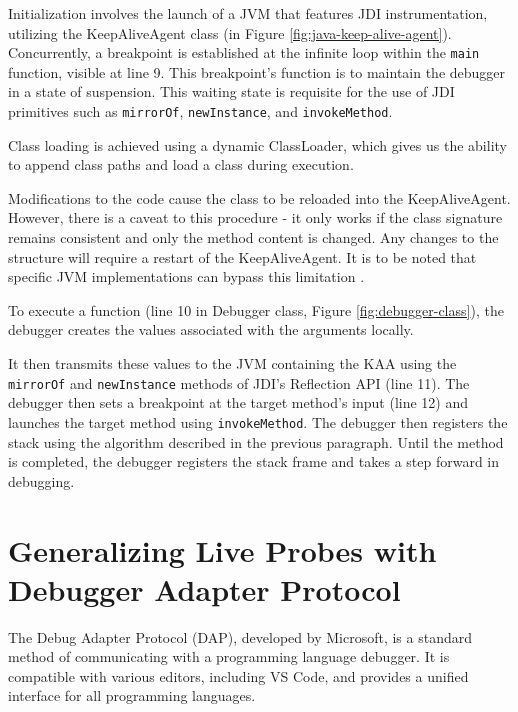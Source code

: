 \documentclass[english,submission]{programming}
\newcommand{\code}[1]{\colorbox{codegray}{\texttt{#1}}}
\begin{document}
Initialization involves the launch of a JVM that features JDI instrumentation, utilizing the KeepAliveAgent class (in Figure \ref{fig:java-keep-alive-agent}). 
Concurrently, a breakpoint is established at the infinite loop within the \code{main} function, visible at line 9. 
This breakpoint's function is to maintain the debugger in a state of suspension. This waiting state is requisite for the use of JDI primitives such as \code{mirrorOf}, \code{newInstance}, and \code{invokeMethod}.

Class loading is achieved using a dynamic ClassLoader, which gives us the ability to append class paths and load a class during execution. 

Modifications to the code cause the class to be reloaded into the KeepAliveAgent.
However, there is a caveat to this procedure - it only works if the class signature remains consistent and only the method content is changed. 
Any changes to the structure will require a restart of the KeepAliveAgent. 
It is to be noted that specific JVM implementations can bypass this limitation \cite{}.

To execute a function (line 10 in Debugger class, Figure \ref{fig:debugger-class}), the debugger creates the values associated with the arguments locally.

It then transmits these values to the JVM containing the KAA using the \code{mirrorOf} and \code{newInstance} methods of JDI's Reflection API (line 11).
The debugger then sets a breakpoint at the target method's input (line 12) and launches the target method using \code{invokeMethod}. 
The debugger then registers the stack using the algorithm described in the previous paragraph.
Until the method is completed, the debugger registers the stack frame and takes a step forward in debugging.

\section{Generalizing Live Probes with Debugger Adapter Protocol}
\label{sec:generalizing-live-probes}
The Debug Adapter Protocol (DAP), developed by Microsoft, is a standard method of communicating with a programming language debugger. It is compatible with various editors, including VS Code, and provides a unified interface for all programming languages. 
\end{document}
